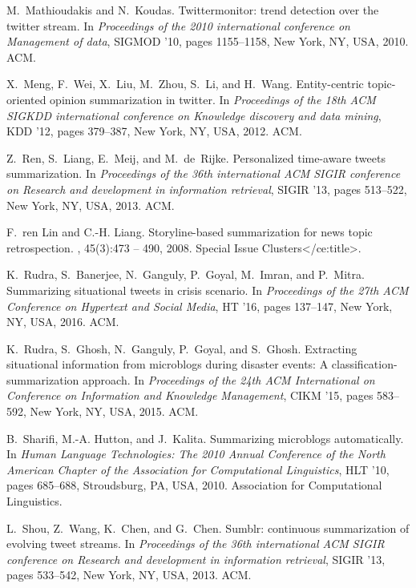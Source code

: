 \documentclass[envcountsame]{llncs}
\begin{document}
\begin{thebibliography}{10}
M.~Mathioudakis and N.~Koudas.
\newblock Twittermonitor: trend detection over the twitter stream.
\newblock In {\em Proceedings of the 2010 international conference on
  Management of data}, SIGMOD '10, pages 1155--1158, New York, NY, USA, 2010.
  ACM.

X.~Meng, F.~Wei, X.~Liu, M.~Zhou, S.~Li, and H.~Wang.
\newblock Entity-centric topic-oriented opinion summarization in twitter.
\newblock In {\em Proceedings of the 18th ACM SIGKDD international conference
  on Knowledge discovery and data mining}, KDD '12, pages 379--387, New York,
  NY, USA, 2012. ACM.

Z.~Ren, S.~Liang, E.~Meij, and M.~de~Rijke.
\newblock Personalized time-aware tweets summarization.
\newblock In {\em Proceedings of the 36th international ACM SIGIR conference on
  Research and development in information retrieval}, SIGIR '13, pages
  513--522, New York, NY, USA, 2013. ACM.

F.~ren Lin and C.-H. Liang.
\newblock Storyline-based summarization for news topic retrospection.
, 45(3):473 -- 490, 2008.
Special Issue Clusters</ce:title>.

K.~Rudra, S.~Banerjee, N.~Ganguly, P.~Goyal, M.~Imran, and P.~Mitra.
\newblock Summarizing situational tweets in crisis scenario.
\newblock In {\em Proceedings of the 27th ACM Conference on Hypertext and
  Social Media}, HT '16, pages 137--147, New York, NY, USA, 2016. ACM.

K.~Rudra, S.~Ghosh, N.~Ganguly, P.~Goyal, and S.~Ghosh.
\newblock Extracting situational information from microblogs during disaster
  events: A classification-summarization approach.
\newblock In {\em Proceedings of the 24th ACM International on Conference on
  Information and Knowledge Management}, CIKM '15, pages 583--592, New York,
  NY, USA, 2015. ACM.

B.~Sharifi, M.-A. Hutton, and J.~Kalita.
\newblock Summarizing microblogs automatically.
\newblock In {\em Human Language Technologies: The 2010 Annual Conference of
  the North American Chapter of the Association for Computational Linguistics},
  HLT '10, pages 685--688, Stroudsburg, PA, USA, 2010. Association for
  Computational Linguistics.

L.~Shou, Z.~Wang, K.~Chen, and G.~Chen.
\newblock Sumblr: continuous summarization of evolving tweet streams.
\newblock In {\em Proceedings of the 36th international ACM SIGIR conference on
  Research and development in information retrieval}, SIGIR '13, pages
  533--542, New York, NY, USA, 2013. ACM.


\end{thebibliography}
\end{document}
